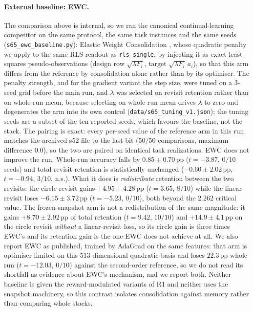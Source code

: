 \documentclass[preprint,12pt]{elsarticle}
\begin{document}
\paragraph{External baseline: EWC.} The comparison above is internal, so we ran
the canonical continual-learning competitor on the same protocol, the same
task instances and the same seeds (\texttt{s65\_ewc\_baseline.py}): Elastic
Weight Consolidation \cite{kirkpatrick2017}, whose quadratic penalty we apply
to the same RLS readout as \texttt{rls\_single}, by injecting it as exact
least-squares pseudo-observations (design row $\sqrt{\lambda F_i}$, target
$\sqrt{\lambda F_i}\,a_i$), so that this arm differs from the reference by
consolidation alone rather than by its optimiser. The penalty strength, and
for the gradient variant the step size, were tuned on a $3$-seed grid before
the main run, and $\lambda$ was selected on revisit retention rather than on
whole-run mean, because selecting on whole-run mean drives $\lambda$ to zero
and degenerates the arm into its own control
(\texttt{data/s65\_tuning\_v1.json}); the tuning seeds are a subset of the ten
reported seeds, which favours the baseline, not the stack. The pairing is
exact: every per-seed value of the reference arm in this run matches the
archived s52 file to the last bit ($50/50$ comparisons, maximum difference
$0.0$), so the two are paired on identical task realizations. EWC does not
improve the run. Whole-run accuracy falls by $0.85\pm0.70$\,pp ($t=-3.87$,
$0/10$ seeds) and total revisit retention is statistically unchanged
($-0.60\pm2.02$\,pp, $t=-0.94$, $3/10$, n.s.). What it does is
\emph{redistribute} retention between the two revisits: the circle revisit
gains $+4.95\pm4.28$\,pp ($t=3.65$, $8/10$) while the linear revisit loses
$-6.15\pm3.72$\,pp ($t=-5.23$, $0/10$), both beyond the $2.262$ critical
value. The frozen-snapshot arm is not a redistribution of the same magnitude:
it gains $+8.70\pm2.92$\,pp of total retention ($t=9.42$, $10/10$) and
$+14.9\pm4.1$\,pp on the circle revisit \emph{without} a linear-revisit loss,
so its circle gain is three times EWC's and its retention gain is the one EWC
does not achieve at all. We also report EWC as published, trained by AdaGrad
on the same features: that arm is optimiser-limited on this $513$-dimensional
quadratic basis and loses $22.3$\,pp whole-run ($t=-12.03$, $0/10$) against
the second-order reference, so we do not read its shortfall as evidence about
EWC's mechanism, and we report both. Neither baseline is given the
reward-modulated variants of R1 and neither uses the snapshot machinery, so
this contrast isolates consolidation against memory rather than comparing
whole stacks.
\end{document}
